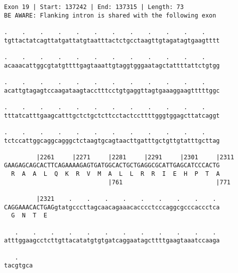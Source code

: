 \documentclass{article}
\begin{document}
\newpage
\begin{Verbatim}
Exon 19 | Start: 137242 | End: 137315 | Length: 73
BE AWARE: Flanking intron is shared with the following exon
 
.    .    .    .    .    .    .    .    .    .    .    .    
tgttactatcagttatgattatgtaatttactctgcctaagttgtagatagtgaagtttt
  
.    .    .    .    .    .    .    .    .    .    .    .    
acaaacattggcgtatgttttgagtaaattgtaggtgggaatagctattttattctgtgg
  
.    .    .    .    .    .    .    .    .    .    .    .    
acattgtagagtccaagataagtacctttcctgtgaggttagtgaaaggaagtttttggc
  
.    .    .    .    .    .    .    .    .    .    .    .    
tttatcatttgaagcatttgctctgctcttcctactccttttgggtggagcttatcaggt
  
.    .    .    .    .    .    .    .    .    .    .    .    
tctccattggcaggcagggctctaagtgcagtaacttgatttgctgttgtatttgcttag
  
         |2261     |2271     |2281     |2291     |2301     |2311
GAAGAGCAGCACTTCAGAAAAGAGTGATGGCACTGCTGAGGCGCATTGAGCATCCCACTG
  R  A  A  L  Q  K  R  V  M  A  L  L  R  R  I  E  H  P  T  A
                             |761                          |771
  
         |2321    .    .    .    .    .    .    .    .    . 
CAGGAAACACTGAGgtatgcccttagcaacagaaacacccctcccaggcgcccaccctca
  G  N  T  E                                                
  
   .    .    .    .    .    .    .    .    .    .    .    . 
atttggaagcctcttgttacatatgtgtgatcaggaatagcttttgaagtaaatccaaga
  
   .    
tacgtgca
\end{Verbatim}
\newpage
\end{document}

